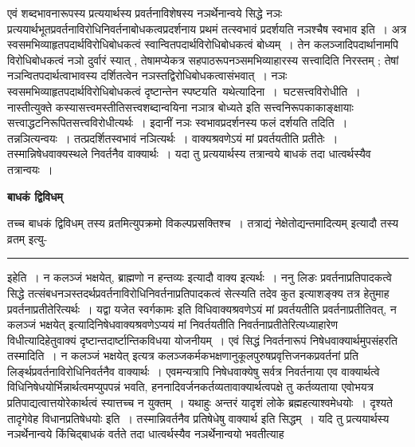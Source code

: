 \documentclass[11pt, openany]{book}
\begin{document}
 एवं शब्दभावनारूपस्य प्रत्ययार्थस्य प्रवर्तनाविशेषस्य नञर्थेनान्वये सिद्धे  नञः प्रत्ययार्थभूतप्रवर्तनाविरोधिनिवर्तनाबोधकत्वप्रदर्शनाय प्रथमं तत्स्वभावं प्रदर्शयति {\br नञश्चैष स्वभाव इति~।} अत्र स्वसमभिव्याहृतपदार्थविरोधिबोधकत्वं स्वान्वितपदार्थविरोधिबोधकत्वं बोध्यम्~। तेन कलञ्जादिपदार्थानामपि  विरोधिबोधकत्वं नञो दुर्वारं स्यात् , तेषामप्येकत्र सहपाठरूपनञ्समभिव्याहारस्य  सत्त्वादिति निरस्तम् ; तेषां नञन्वितपदार्थत्वाभावस्य दर्शितत्वेन नञस्तद्विरोधिबोधकत्वासंभवात्~। नञः स्वसमभिव्याहृतपदार्थविरोधिबोधकत्वं दृष्टान्तेन स्पष्टयति\textemdash\ {\br यथेत्यादिना~।~घटसत्त्वविरोधीति~।} नास्तीत्युक्ते कस्यासत्त्वमस्तीतिसत्त्वशब्दान्वयिना नञात्र बोध्यते इति सत्त्वनिरूपकाकाङ्क्षायाः  सत्त्वाद्धटनिरूपितसत्त्वविरोधीत्यर्थः~। इदानीं नञः स्वभावप्रदर्शनस्य फलं  दर्शयति {\br तदिति~।} तन्नञित्यन्वयः~। तत्प्रदर्शितस्वभावं नञित्यर्थः~।
\newpage
\fancyhead[LO]{[ बाधकं द्विविधम् ]}
{\bl\noindent
वाक्यश्रवणेऽयं मां प्रवर्तयतीति प्रतीतेः~। तस्मान्निषेधवाक्यस्थले निवर्तनैव वाक्यार्थः~। यदा तु प्रत्ययार्थस्य तत्रान्वये बाधकं  तदा धात्वर्थस्यैव तत्रान्वयः~।}
\begin{center}
 \textbf{बाधकं द्विविधम् }   
\end{center}
 
{\bl तच्च बाधकं द्विविधम् {\al तस्य व्रतमित्युपक्रमो विकल्पप्रसक्तिश्च~}। तत्राद्यं {\qtl नेक्षेतोद्यन्तमादित्यम्} इत्यादौ {\qtl तस्य व्रतम्} इत्यु-}\\
\hrule
\vspace{3mm}
\noindent
{\br इहेति~।} {\qt न कलञ्जं भक्षयेत्, ब्राह्मणो न हन्तव्यः} इत्यादौ वाक्य इत्यर्थः~। {\br ननु} लिङः प्रवर्तनाप्रतिपादकत्वे सिद्धे तत्संबधनञस्तदर्थप्रवर्तनाविरोधिनिवर्तनाप्रतिपादकत्वं सेत्स्यति तदेव कुत इत्याशङ्क्य तत्र हेतुमाह प्रवर्तनाप्रतीतेरित्यर्थः~। यद्वा  {\qt यजेत स्वर्गकामः} इति विधिवाक्यश्रवणेऽयं मां प्रवर्तयतीति प्रवर्तनाप्रतीतिवत्, {\qt न कलञ्जं भक्षयेत्}  इत्यादिनिषेधवाक्यश्रवणेऽप्ययं मां निवर्तयतीति निवर्तनाप्रतीतेरित्यध्याहारेण  विधीत्यादिहेतुवाक्यं दृष्टान्तदार्ष्टान्तिकविधया योजनीयम्~। एवं सिद्धं निवर्तनारूपं निषेधवाक्यार्थमुपसंहरति {\br तस्मादिति~।}  {\qt न कलञ्जं भक्षयेत्} इत्यत्र  कलञ्जकर्मकभक्षणानुकूलपुरुषप्रवृत्तिजनकप्रवर्तनां प्रति लिर्ङ्थप्रवर्तनाविरोधिनिवर्तनैव वाक्यार्थः~। एवमन्यत्रापि निषेधवाक्येषु सर्वत्र निवर्तनाया एव 
वाक्यार्थत्वे विधिनिषेधयोर्भिन्नार्थत्वमप्युपपन्नं भवति, हननादिवर्जनकर्तव्यतावाक्यार्थत्वपक्षे तु कर्तव्यताया एवोभयत्र प्रतिपाद्यत्वात्तयोरेकार्थत्वं स्यात्तच्च न  युक्तम्~। यथाहुः {\qt अन्तरं यादृशं लोके ब्रह्महत्याश्वमेधयोः~। दृश्यते तादृगेवेह  विधानप्रतिषेधयोः}  इति~। तस्मान्निवर्तनैव प्रतिषेधेषु वाक्यार्थ इति सिद्धम्~। यदि तु प्रत्ययार्थस्य नञर्थेनान्वये किंचिद्बाधकं वर्तते तदा धात्वर्थस्यैव नञर्थेनान्वयो भवतीत्याह \\
\end{document}

